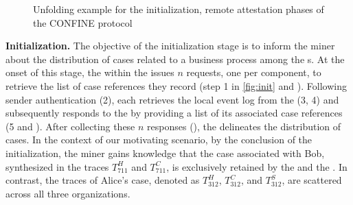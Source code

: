 \begin{figure}[t]
	\hfill
	\hfill
	\caption{Unfolding example for the initialization, remote attestation phases of the CONFINE protocol}
	\label{fig:workflow}
\end{figure}

\noindent\textbf{Initialization.} The objective of the initialization stage is to inform the miner about the distribution of cases related to a business process among the s. At the onset of this stage, the  within the  issues $n$ requests, one per  component, %
to retrieve the list of case references they record (step 1 in \cref{fig:init} and ). Following sender authentication (2), each  retrieves the local event log from the  (3, 4) and subsequently responds to the  by providing a list of its associated case references (5 and ). After collecting these $n$ responses (), the  delineates the distribution of cases. In the context of our motivating scenario, by the conclusion of the initialization, the miner gains knowledge that the case associated with Bob, synthesized in the traces $T^H_{711}$ and $T^C_{711}$, is exclusively retained by the  and the . In contrast, the traces of Alice's case, denoted as $T^H_{312}$, $T^C_{312}$, and $T^S_{312}$, are scattered across all three organizations.

